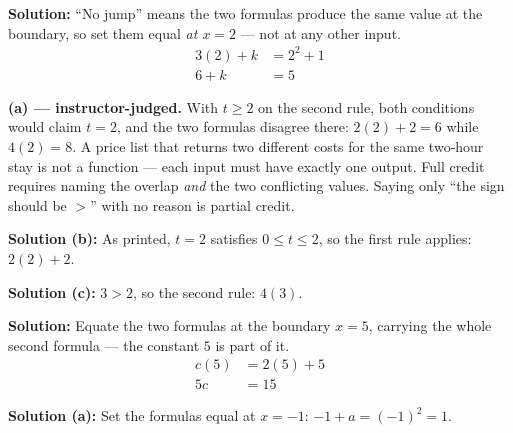 \documentclass[12pt]{article}
\begin{document}

\textbf{Solution:} ``No jump'' means the two formulas produce the same value at the boundary, so set them equal \emph{at $x = 2$} --- not at any other input.
\begin{align*}
  3(2) + k &= 2^2 + 1 \\
  6 + k &= 5
\end{align*}


\textbf{(a) --- instructor-judged.} With $t \ge 2$ on the second rule, both conditions would claim $t = 2$, and the two formulas disagree there: $2(2)+2 = 6$ while $4(2) = 8$. A price list that returns two different costs for the same two-hour stay is not a function --- each input must have exactly one output. Full credit requires naming the overlap \emph{and} the two conflicting values. Saying only ``the sign should be $>$'' with no reason is partial credit.

\textbf{Solution (b):} As printed, $t = 2$ satisfies $0 \le t \le 2$, so the first rule applies: $2(2) + 2$. 

\textbf{Solution (c):} $3 > 2$, so the second rule: $4(3)$. 


\textbf{Solution:} Equate the two formulas at the boundary $x = 5$, carrying the whole second formula --- the constant $5$ is part of it.
\begin{align*}
  c(5) &= 2(5) + 5 \\
  5c &= 15
\end{align*}


\textbf{Solution (a):} Set the formulas equal at $x = -1$: $-1 + a = (-1)^2 = 1$. 
\end{document}
